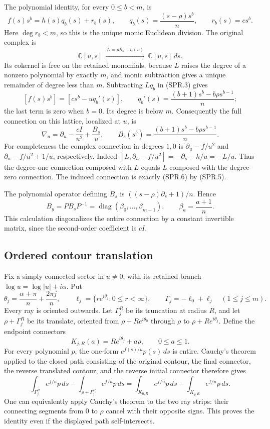 The polynomial identity, for every \(0\leq b<m\), is
\[
 f(s)s^b=h(s)q_b(s)+r_b(s),\qquad
 q_b(s)=\frac{(s-\rho)s^b}{n},\qquad r_b(s)=cs^b.
 \tag{SPR.3}
\]
Here \(\deg r_b<m\), so this is the unique monic Euclidean division.
The original complex is
\[
 \mathbb C[u,s]\ \xrightarrow{\,L=u\partial_s+h(s)\,}\
 \mathbb C[u,s]\,ds .
 \tag{SPR.4}
\]
Its cokernel is free on the retained monomials, because \(L\) raises
the degree of a nonzero polynomial by exactly \(m\), and monic
subtraction gives a unique remainder of degree less than \(m\).
Subtracting \(Lq_b\) in (SPR.3) gives
\[
 [f(s)s^b]=[cs^b-uq_b'(s)],\qquad
 q_b'(s)=\frac{(b+1)s^b-b\rho s^{b-1}}{n};
 \tag{SPR.5}
\]
the last term is zero when \(b=0\). Its degree is below \(m\).
Consequently the full connection on this lattice, localized at \(u\),
is
\[
 \nabla_u=\partial_u-\frac{cI}{u^2}+\frac{B_s}{u},
 \qquad
 B_s(s^b)=\frac{(b+1)s^b-b\rho s^{b-1}}n.
 \tag{SPR.6}
\]
For completeness the complex connection in degrees \(1,0\) is
\(\partial_u-f/u^2\) and \(\partial_u-f/u^2+1/u\), respectively.
Indeed
\([L,\partial_u-f/u^2]=-\partial_s-h/u=-L/u\).
Thus the degree-one connection composed with \(L\) equals \(L\)
composed with the degree-zero connection. The induced connection is
exactly (SPR.6) by (SPR.5).

The polynomial operator defining \(B_s\) is
\(((s-\rho)\partial_s+1)/n\). Hence
\[
 B_y=P B_sP^{-1}
   =\operatorname{diag}(\beta_0,\ldots,\beta_{m-1}),\qquad
 \beta_a=\frac{a+1}{n}.
 \tag{SPR.7}
\]
This calculation diagonalizes the entire connection by a constant
invertible matrix, since the second-order coefficient is \(cI\).

\subsection*{Ordered contour translation}

Fix a simply connected sector in \(u\ne0\), with its retained branch
\(\log u=\log|u|+i\alpha\). Put
\[
 \theta_j=\frac{\alpha+\pi}{n}+\frac{2\pi j}{n},\qquad
 \ell_j=\{r e^{i\theta_j}:0\leq r<\infty\},\qquad
 \Gamma_j=-\ell_0+\ell_j\quad(1\leq j\leq m).
 \tag{SPR.8}
\]
Every ray is oriented outwards. Let \(\Gamma_j^R\) be its truncation
at radius \(R\), and let \(\rho+\Gamma_j^R\) be its translate,
oriented from \(\rho+Re^{i\theta_0}\) through \(\rho\) to
\(\rho+Re^{i\theta_j}\). Define the endpoint connectors
\[
 K_{j,R}(a)=Re^{i\theta_j}+a\rho,\qquad 0\leq a\leq1.
 \tag{SPR.9}
\]
For every polynomial \(p\), the one-form
\(e^{f(s)/u}p(s)\,ds\) is entire. Cauchy's theorem applied to the
closed path consisting of the original contour, the final connector,
the reverse translated contour, and the reverse initial connector
therefore gives
\[
 \int_{\Gamma_j^R}e^{f/u}p\,ds
 -\int_{\rho+\Gamma_j^R}e^{f/u}p\,ds
 =\int_{K_{0,R}}e^{f/u}p\,ds
   -\int_{K_{j,R}}e^{f/u}p\,ds .
 \tag{SPR.10}
\]
One can equivalently apply Cauchy's theorem to the two ray strips:
their connecting segments from \(0\) to \(\rho\) cancel with their
opposite signs. This proves the identity even if the displayed path
self-intersects.

